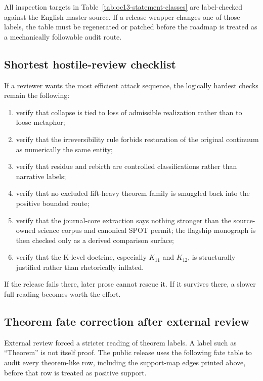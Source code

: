 All inspection targets in Table~\ref{tab:oc13-statement-classes} are
label-checked against the English master source. If a release wrapper changes
one of those labels, the table must be regenerated or patched before the
roadmap is treated as a mechanically followable audit route.

\subsection{Shortest hostile-review checklist}

If a reviewer wants the most efficient attack sequence, the logically hardest
checks remain the following:

\begin{enumerate}
\item verify that collapse is tied to loss of admissible realization rather
      than to loose metaphor;
\item verify that the irreversibility rule forbids restoration of the original
      continuum as numerically the same entity;
\item verify that residue and rebirth are controlled classifications rather
      than narrative labels;
\item verify that no excluded lift-heavy theorem family is smuggled back into
      the positive bounded route;
\item verify that the journal-core extraction says nothing stronger than the
      source-owned science corpus and canonical SPOT permit; the flagship
      monograph is then checked only as a derived comparison surface;
\item verify that the K-level doctrine, especially \(K_{11}\) and \(K_{12}\),
      is structurally justified rather than rhetorically inflated.
\end{enumerate}

If the release fails there, later prose cannot rescue it. If it survives
there, a slower full reading becomes worth the effort.


\subsection{Theorem fate correction after external review}
\label{sec:oc13-theorem-fate-correction-v3}

External review forced a stricter reading of theorem labels. A label such as
``Theorem'' is not itself proof. The public release uses the following fate
table to audit every theorem-like row, including the support-map edges printed
above, before that row is treated as positive support.

